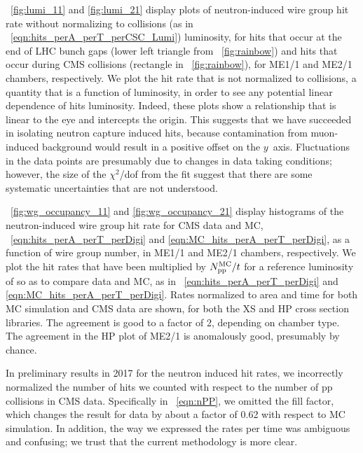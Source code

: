 \Figs~\ref{fig:lumi_11} and \ref{fig:lumi_21} display plots of neutron-induced wire group hit rate without normalizing to \pp collisions (as in \Eq~\ref{eqn:hits_perA_perT_perCSC_Lumi}) \vs luminosity, for hits that occur at the end of LHC bunch gaps (lower left triangle from \FigDot~\ref{fig:rainbow}) and hits that occur during CMS \pp collisions (rectangle in \FigDot~\ref{fig:rainbow}), for ME1/1 and ME2/1 chambers, respectively. We plot the hit rate that is not normalized to \pp collisions, a quantity that is a function of luminosity, in order to see any potential linear dependence of hits \vs luminosity. Indeed, these plots show a relationship that is linear to the eye and intercepts the origin. This suggests that we have succeeded in isolating neutron capture induced hits, because contamination from muon-induced background would result in a positive offset on the $y$~axis. Fluctuations in the data points are presumably due to changes in data taking conditions; however, the size of the $\chi^2$/dof from the fit suggest that there are some systematic uncertainties that are not understood. 

\Figs~\ref{fig:wg_occupancy_11} and \ref{fig:wg_occupancy_21} display histograms of the neutron-induced wire group hit rate for CMS data and MC, \Eqs~\ref{eqn:hits_perA_perT_perDigi} and \ref{eqn:MC_hits_perA_perT_perDigi}, as a function of wire group number, in ME1/1 and ME2/1 chambers, respectively. We plot the hit rates that have been multiplied by ${N_\text{\ensuremath{\mathrm{p}}\ensuremath{\mathrm{p}}}^\text{MC}}/{t}$ for a reference luminosity of  so as to compare data and MC, as in \Eqs~\ref{eqn:hits_perA_perT_perDigi} and \ref{eqn:MC_hits_perA_perT_perDigi}. Rates normalized to area and time for both MC simulation and CMS data are shown, for both the XS and HP cross section libraries. The agreement is good to a factor of 2, depending on chamber type. The agreement in the HP plot of ME2/1 is anomalously good, presumably by chance.

In preliminary results in 2017 for the neutron induced hit rates, we incorrectly normalized the number of hits we counted with respect to the number of pp collisions in CMS data. Specifically in \Eq~\ref{eqn:nPP}, we omitted the fill factor, which changes the result for data by about a factor of 0.62 with respect to MC simulation. In addition, the way we expressed the rates per time was ambiguous and confusing; we trust that the current methodology is more clear. 

